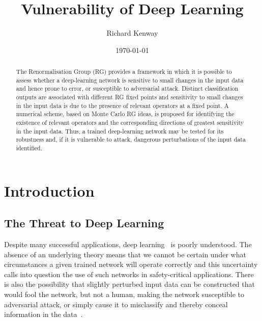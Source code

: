 \documentclass[reprint,amsmath,amssymb,aps]{revtex4-1}
\begin{document}
\title{Vulnerability of Deep Learning}

\author{Richard Kenway}

\date{\today}

\begin{abstract}
The Renormalisation Group (RG) provides a framework in which it is possible to assess whether a deep-learning network is sensitive to small changes in the input data and hence prone to error, or susceptible to adversarial attack. Distinct classification outputs are associated with different RG fixed points and sensitivity to small changes in the input data is due to the presence of relevant operators at a fixed point. A numerical scheme, based on Monte Carlo RG ideas, is proposed for identifying the existence of relevant operators and the corresponding directions of greatest sensitivity in the input data. Thus, a trained deep-learning network may be tested for its robustness and, if it is vulnerable to attack, dangerous perturbations of the input data identified.  
\end{abstract}


\maketitle

\section{\label{sec:introduction} Introduction}

\subsection{\label{subsec:threat} The Threat to Deep Learning}

Despite many successful applications, deep learning~\cite{HintonOsinderoTeh2006, LeCunBengioHinton2015, Salakhutdinov2015} is poorly understood. The absence of an underlying theory means that we cannot be certain under what circumstances a given trained network will operate correctly and this uncertainty calls into question the use of such networks in safety-critical applications. There is also the possibility that slightly perturbed input data can be constructed that would fool the network, but not a human, making the network susceptible to adversarial attack, or simply cause it to misclassify and thereby conceal information in the data~\cite{YuanHeZhuBhatLi2018}.
\end{document}
